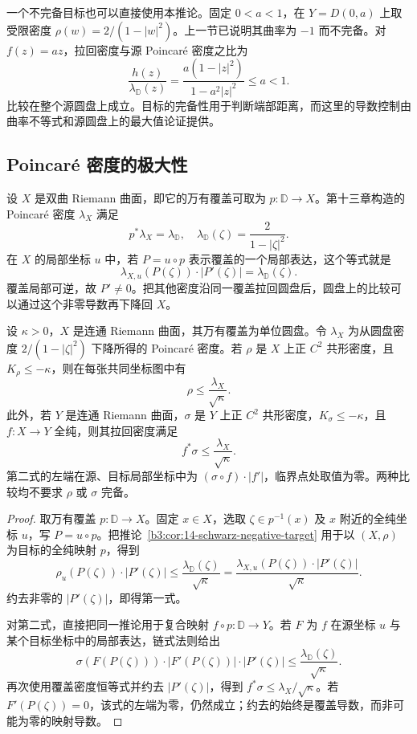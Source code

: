 \ProseParagraphBreak
一个不完备目标也可以直接使用本推论。固定 \(0<a<1\)，在 \(Y=D(0,a)\) 上取受限密度 \(\rho(w)=2/(1-|w|^2)\)。上一节已说明其曲率为 \(-1\) 而不完备。对 \(f(z)=az\)，拉回密度与源 Poincaré 密度之比为
\[
 \frac{h(z)}{\lambda_{\mathbb D}(z)}
 =\frac{a(1-|z|^2)}{1-a^2|z|^2}\le a<1.
\]
比较在整个源圆盘上成立。目标的完备性用于判断端部距离，而这里的导数控制由曲率不等式和源圆盘上的最大值论证提供。

\subsection{Poincaré 密度的极大性}
\label{b3:subsec:140203}

设 \(X\) 是双曲 Riemann 曲面，即它的万有覆盖可取为 \(p:\mathbb D\to X\)。第十三章构造的 Poincaré 密度 \(\lambda_X\) 满足
\[
 p^*\lambda_X=\lambda_{\mathbb D},
 \quad \lambda_{\mathbb D}(\zeta)=\frac{2}{1-|\zeta|^2}.
\]
在 \(X\) 的局部坐标 \(u\) 中，若 \(P=u\circ p\) 表示覆盖的一个局部表达，这个等式就是
\[
 \lambda_{X,u}(P(\zeta))\cdot|P'(\zeta)|
 =\lambda_{\mathbb D}(\zeta).
\]
覆盖局部可逆，故 \(P'\ne0\)。把其他密度沿同一覆盖拉回圆盘后，圆盘上的比较可以通过这个非零导数再下降回 \(X\)。

\begin{theorem}\label{b3:thm:14-hyperbolic-density-maximal}
设 \(\kappa>0\)，\(X\) 是连通 Riemann 曲面，其万有覆盖为单位圆盘。令 \(\lambda_X\) 为从圆盘密度 \(2/(1-|\zeta|^2)\) 下降所得的 Poincaré 密度。若 \(\rho\) 是 \(X\) 上正 \(C^2\) 共形密度，且 \(K_\rho\le-\kappa\)，则在每张共同坐标图中有
\[
 \rho\le\frac{\lambda_X}{\sqrt\kappa}.
\]
此外，若 \(Y\) 是连通 Riemann 曲面，\(\sigma\) 是 \(Y\) 上正 \(C^2\) 共形密度，\(K_\sigma\le-\kappa\)，且 \(f:X\to Y\) 全纯，则其拉回密度满足
\[
 f^*\sigma\le\frac{\lambda_X}{\sqrt\kappa}.
\]
第二式的左端在源、目标局部坐标中为 \((\sigma\circ f)\cdot|f'|\)，临界点处取值为零。两种比较均不要求 \(\rho\) 或 \(\sigma\) 完备。
\end{theorem}
\begin{proof}
取万有覆盖 \(p:\mathbb D\to X\)。固定 \(x\in X\)，选取 \(\zeta\in p^{-1}(x)\) 及 \(x\) 附近的全纯坐标 \(u\)，写 \(P=u\circ p\)。把推论~\ref{b3:cor:14-schwarz-negative-target} 用于以 \((X,\rho)\) 为目标的全纯映射 \(p\)，得到
\[
 \rho_u(P(\zeta))\cdot|P'(\zeta)|
 \le\frac{\lambda_{\mathbb D}(\zeta)}{\sqrt\kappa}
 =\frac{\lambda_{X,u}(P(\zeta))\cdot|P'(\zeta)|}{\sqrt\kappa}.
\]
约去非零的 \(|P'(\zeta)|\)，即得第一式。

对第二式，直接把同一推论用于复合映射 \(f\circ p:\mathbb D\to Y\)。若 \(F\) 为 \(f\) 在源坐标 \(u\) 与某个目标坐标中的局部表达，链式法则给出
\[
 \sigma(F(P(\zeta)))\cdot|F'(P(\zeta))|\cdot|P'(\zeta)|
 \le\frac{\lambda_{\mathbb D}(\zeta)}{\sqrt\kappa}.
\]
再次使用覆盖密度恒等式并约去 \(|P'(\zeta)|\)，得到 \(f^*\sigma\le\lambda_X/\sqrt\kappa\)。若 \(F'(P(\zeta))=0\)，该式的左端为零，仍然成立；约去的始终是覆盖导数，而非可能为零的映射导数。
\end{proof}

